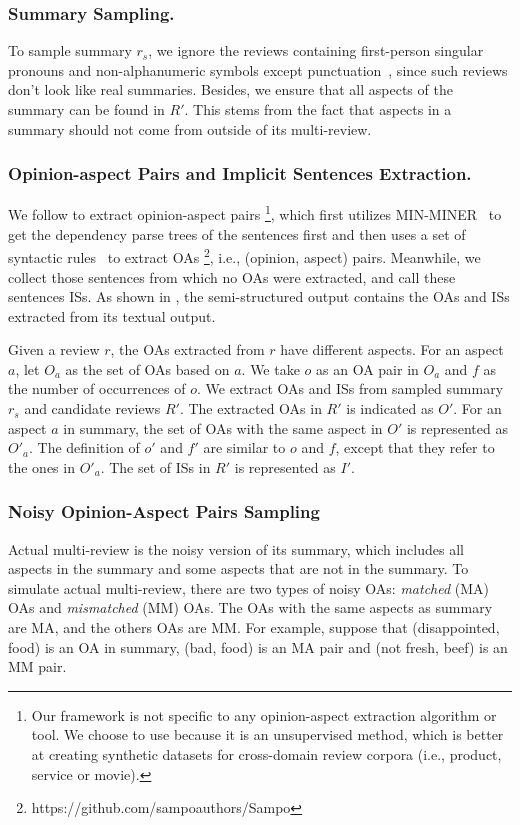 \subsubsection{Summary Sampling.} 
To sample summary $r_s$,
we ignore the reviews containing first-person singular pronouns
and non-alphanumeric symbols except punctuation~\cite{Denoise20},
since such reviews don't look like real summaries.
Besides, we ensure that all aspects of the summary can be found in $R'$.
This stems from the fact that aspects in a summary should not come  
from outside of its multi-review.

\subsubsection{Opinion-aspect Pairs and Implicit Sentences Extraction.} 
We follow \citet{sampo} to extract opinion-aspect pairs
\footnote{Our framework is not specific to any opinion-aspect extraction algorithm or tool.            
We choose to use \cite{sampo} because it is an unsupervised method, 
which is better at creating synthetic datasets for cross-domain review corpora (i.e., product, service or movie).}, 
which first utilizes MIN-MINER~\cite{basicOpiMin20} to 
get the dependency parse trees of the sentences first and then uses a set of 
syntactic rules~\cite{aspect12} to extract OAs
 \footnote{https://github.com/sampoauthors/Sampo}, 
i.e., (opinion, aspect) pairs.
Meanwhile, we collect those sentences from which no OAs were extracted, and call these sentences ISs. 
As shown in , the semi-structured output contains the OAs and ISs extracted from 
its textual output.

Given a review $r$, the OAs extracted from $r$ have different aspects.
For an aspect $a$,
let $O_a$ as the set of OAs based on $a$. 
We take $o$ as an OA pair in $O_a$
and $f$ as the number of occurrences of $o$.
We extract OAs and ISs from sampled summary $r_s$
and candidate reviews $R'$.
The extracted OAs in $R'$ is indicated as $O'$.
For an aspect $a$ in summary,
the set of OAs with the same aspect in $O'$ is represented as $O'_a$.%
The definition of $o'$ and $f'$%
are similar to $o$ and $f$, except that they refer to the ones in $O'_a$.
The set of ISs in $R'$ is represented as $I'$.

\subsubsection{Noisy Opinion-Aspect Pairs Sampling}
Actual multi-review is the noisy version of its summary,
which includes all aspects in the summary and some aspects that are not in the summary.
To simulate actual multi-review, 
there are two types of noisy OAs: 
{\em matched} (MA) OAs and {\em mismatched} (MM) OAs.
The OAs with the same aspects as summary are MA,
and the others OAs are MM.
For example, suppose that (disappointed, food) is an OA in summary,
(bad, food) is an MA pair and (not fresh, beef) is an MM pair.

